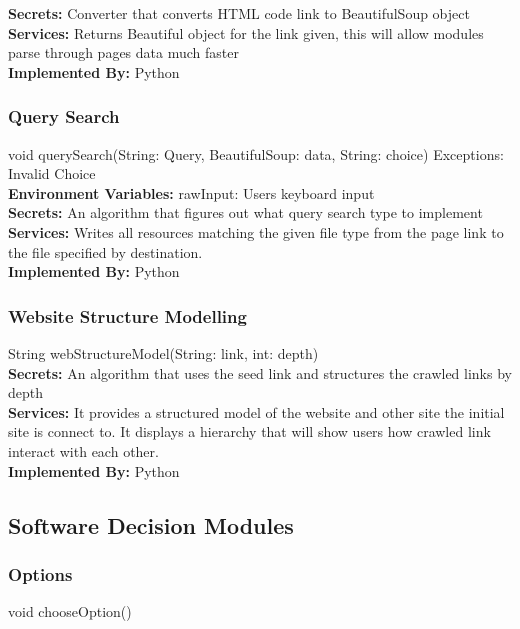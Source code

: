 \documentclass[titlepage]{article}
\begin{document}
\textbf{Secrets:}
Converter that converts HTML code link to BeautifulSoup object \\

\textbf{Services:}
Returns Beautiful object for the link given, this will allow modules parse through pages data much faster\\

\textbf{Implemented By:} Python

\subsubsection{Query Search}
void querySearch(String: Query, BeautifulSoup: data, String: choice) Exceptions: Invalid Choice\\

\textbf{Environment Variables:}
rawInput: Users keyboard input\\

\textbf{Secrets:}
An algorithm that figures out what query search type to implement \\

\textbf{Services:}
Writes all resources matching the given file type from the page link to the file specified by destination.\\

\textbf{Implemented By:}
Python

\subsubsection{Website Structure Modelling}
String webStructureModel(String: link, int: depth)\\

\textbf{Secrets:}
 An algorithm that uses the seed link and structures the crawled links by depth\\
 
\textbf{Services:}
It provides a structured model of the website and other site the initial site is connect to. It displays a hierarchy that will show users how crawled link interact with each other.\\

\textbf{Implemented By:}
Python

\subsection{Software Decision Modules}
\subsubsection{Options}
void chooseOption()\\
\end{document}
